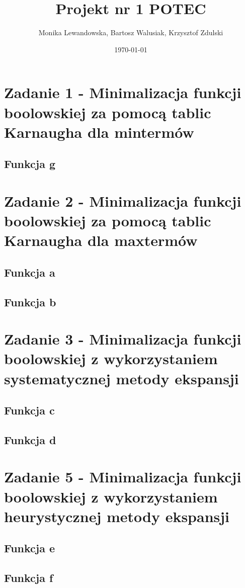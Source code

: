 \documentclass[a4paper, 12pt]{article}
\begin{document}
    \title{Projekt nr 1 POTEC}
    \author{Monika Lewandowska, Bartosz Walusiak, Krzysztof Zdulski}
    \date{\today}
    \maketitle

    \tableofcontents

    \newpage
    \section{Zadanie 1 - Minimalizacja funkcji boolowskiej za pomocą tablic Karnaugha dla mintermów}\label{sec:task-1}
    \subsection{Funkcja g}\label{subsec:fun-g}
    

    \newpage
    \section{Zadanie 2 - Minimalizacja funkcji boolowskiej za pomocą tablic Karnaugha dla maxtermów}\label{sec:task-2}
    \subsection{Funkcja a}\label{subsec:fun-a}
    

    \newpage
    \subsection{Funkcja b}\label{subsec:fun-b}
    

    \newpage
    \section{Zadanie 3 - Minimalizacja funkcji boolowskiej z wykorzystaniem systematycznej metody ekspansji}\label{sec:task-3}
    \subsection{Funkcja c}\label{subsec:fun-c}
    

    \newpage
    \subsection{Funkcja d}\label{subsec:fun-d}
    

    \newpage
    \section{Zadanie 5 - Minimalizacja funkcji boolowskiej z wykorzystaniem heurystycznej metody ekspansji}\label{sec:task-4}
    \subsection{Funkcja e}\label{subsec:fun-e}
    

    \newpage
    \subsection{Funkcja f}\label{subsec:fun-f}
    
\end{document}

